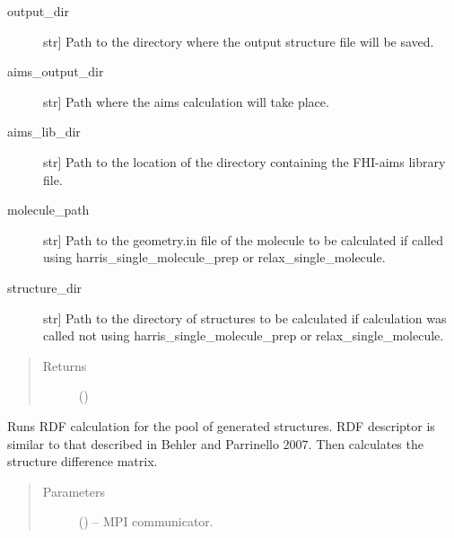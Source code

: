 \documentclass[letterpaper,10pt,english]{sphinxmanual}
\begin{document}
\begin{fulllineitems}
\begin{fulllineitems}
\begin{description}
\item[{output\_dir}] \leavevmode{[}str{]}
Path to the directory where the output structure file will be saved.

\item[{aims\_output\_dir}] \leavevmode{[}str{]}
Path where the aims calculation will take place.

\item[{aims\_lib\_dir}] \leavevmode{[}str{]}
Path to the location of the directory containing the FHI-aims library
file.

\item[{molecule\_path}] \leavevmode{[}str{]}
Path to the geometry.in file of the molecule to be calculated if
called using harris\_single\_molecule\_prep or relax\_single\_molecule.

\item[{structure\_dir}] \leavevmode{[}str{]}
Path to the directory of structures to be calculated if calculation
was called not using harris\_single\_molecule\_prep or
relax\_single\_molecule.

\end{description}
\begin{quote}\begin{description}
\item[{Returns}] \leavevmode
{} ()

\end{description}\end{quote}

\end{fulllineitems}


\begin{fulllineitems}
\label{\detokenize{index:Genarris.genarris_master.Genarris.Run_Rdf_Calc}}
Runs RDF calculation for the pool of generated structures. RDF
descriptor is similar to that described in Behler and Parrinello 2007.
Then calculates the structure difference matrix.
\begin{quote}\begin{description}
\item[{Parameters}] \leavevmode
{} () -- MPI communicator.


\end{description}
\end{quote}
\end{fulllineitems}
\end{fulllineitems}
\end{document}
